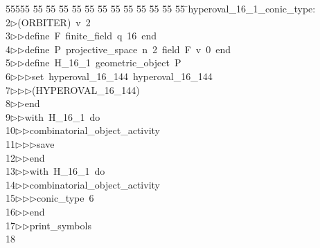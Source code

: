 %
%
\begin{tabbing}
55555 \= 55 \= 55 \= 55 \= 55 \= 55 \= 55 \= 55 \= 55 \= 55 \= 55 \= 55 \= 55 \= \>hyperoval\_16\_1\_conic\_type:\\[0pt]
2\>$\triangleright$\>(ORBITER)\ v\ 2\ \\[0pt]
3\>$\triangleright$\>$\triangleright$\>define\ F\ finite\_field\ q\ 16\ end\ \\[0pt]
4\>$\triangleright$\>$\triangleright$\>define\ P\ projective\_space\ n\ 2\ field\ F\ v\ 0\ end\ \\[0pt]
5\>$\triangleright$\>$\triangleright$\>define\ H\_16\_1\ geometric\_object\ P\ \\[0pt]
6\>$\triangleright$\>$\triangleright$\>$\triangleright$\>set\ hyperoval\_16\_144\ hyperoval\_16\_144\ \\[0pt]
7\>$\triangleright$\>$\triangleright$\>$\triangleright$\>(HYPEROVAL\_16\_144)\ \\[0pt]
8\>$\triangleright$\>$\triangleright$\>end\ \\[0pt]
9\>$\triangleright$\>$\triangleright$\>with\ H\_16\_1\ do\ \\[0pt]
10\>$\triangleright$\>$\triangleright$\>combinatorial\_object\_activity\ \\[0pt]
11\>$\triangleright$\>$\triangleright$\>$\triangleright$\>save\ \\[0pt]
12\>$\triangleright$\>$\triangleright$\>end\ \\[0pt]
13\>$\triangleright$\>$\triangleright$\>with\ H\_16\_1\ do\ \\[0pt]
14\>$\triangleright$\>$\triangleright$\>combinatorial\_object\_activity\ \\[0pt]
15\>$\triangleright$\>$\triangleright$\>$\triangleright$\>conic\_type\ 6\ \\[0pt]
16\>$\triangleright$\>$\triangleright$\>end\ \\[0pt]
17\>$\triangleright$\>$\triangleright$\>print\_symbols\\[0pt]
18\>\end{tabbing}
